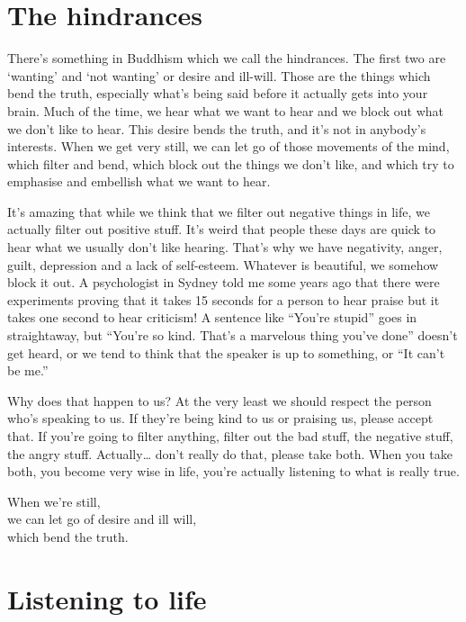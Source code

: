 \documentclass[12pt, openany]{book}
\newenvironment{aphorism}%
{%
\begin{center}\begin{itshape}
}%
{\end{itshape}\end{center}
}%
\begin{document}
\section*{The hindrances}

There’s something in Buddhism which we call the hindrances. The first two are ‘wanting’ and ‘not wanting’ or desire and ill-will. Those are the things which bend the truth, especially what’s being said before it actually gets into your brain. Much of the time, we hear what we want to hear and we block out what we don’t like to hear. This desire bends the truth, and it’s not in anybody’s interests. When we get very still, we can let go of those movements of the mind, which filter and bend, which block out the things we don’t like, and which try to emphasise and embellish what we want to hear. 

It’s amazing that while we think that we filter out negative things in life, we actually filter out positive stuff. It’s weird that people these days are quick to hear what we usually don’t like hearing. That’s why we have negativity, anger, guilt, depression and a lack of self-esteem. Whatever is beautiful, we somehow block it out. A psychologist in Sydney told me some years ago that there were experiments proving that it takes 15 seconds for a person to hear praise but it takes one second to hear criticism! A sentence like “You’re stupid” goes in straightaway, but “You’re so kind. That’s a marvelous thing you’ve done” doesn’t get heard, or we tend to think that the speaker is up to something, or “It can’t be me.” 

Why does that happen to us? At the very least we should respect the person who’s speaking to us. If they’re being kind to us or praising us, please accept that. If you’re going to filter anything, filter out the bad stuff, the negative stuff, the angry stuff. Actually… don’t really do that, please take both. When you take both, you become very wise in life, you’re actually listening to what is really true. 

\begin{aphorism}
When we’re still,\\  
we can let go of desire and ill will,\\ 
which bend the truth.
\end{aphorism}

\section*{Listening to life}
\end{document}

